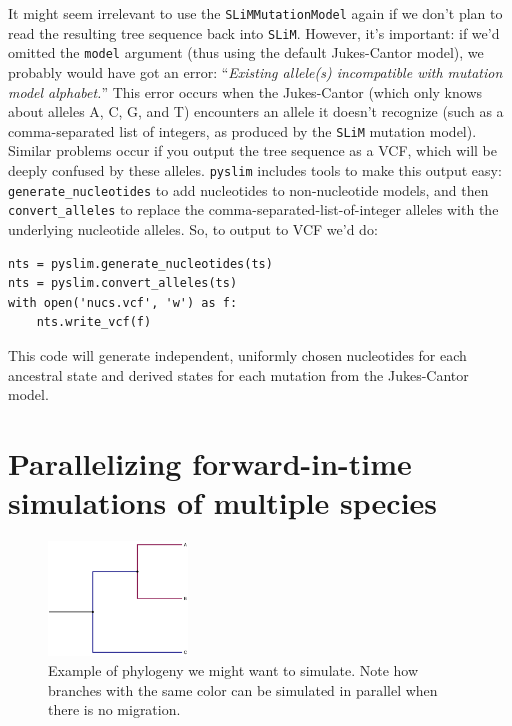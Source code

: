 \documentclass[12pt]{article}
\newcommand{\slim}[0]{\texttt{SLiM}\xspace}
\newcommand{\pyslim}[0]{\texttt{pyslim}\xspace}
\begin{document}
It might seem irrelevant to use the \verb|SLiMMutationModel| again
if we don't plan to read the resulting tree sequence back into \slim.
However, it's important: if we'd omitted the \verb|model| argument
(thus using the default Jukes-Cantor model),
we probably would have got an error:
``\textit{Existing allele(s) incompatible with mutation model alphabet.}''
This error occurs when the Jukes-Cantor (which only knows about alleles A, C, G, and T)
encounters an allele it doesn't recognize
(such as a comma-separated list of integers, as produced by the \slim mutation model).
Similar problems occur if you output the tree sequence as a VCF,
which will be deeply confused by these alleles.
\pyslim includes tools to make this output easy:
\verb|generate_nucleotides| to add nucleotides to non-nucleotide models,
and then \verb|convert_alleles| to replace the comma-separated-list-of-integer alleles
with the underlying nucleotide alleles.
So, to output to VCF we'd do:
\begin{verbatim}
nts = pyslim.generate_nucleotides(ts)
nts = pyslim.convert_alleles(ts)
with open('nucs.vcf', 'w') as f:
    nts.write_vcf(f)
\end{verbatim}

This code will generate independent, uniformly chosen nucleotides
for each ancestral state and derived states for each mutation
from the Jukes-Cantor model.


\section*{Parallelizing forward-in-time simulations of multiple species}

\begin{figure}[h!]
    \centering
     \includegraphics[width=0.33\textwidth]{./code/parallelizing_phylogeny/phylo.pdf}
     \caption{Example of phylogeny we might want to simulate. Note how branches with the same color can be simulated in parallel when there is no migration.}
     \label{fig:phylo}
    \end{figure}
\end{document}
